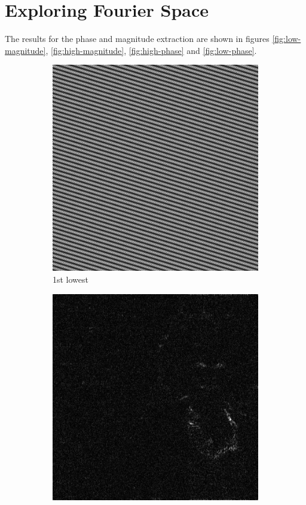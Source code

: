 \section{Exploring Fourier Space}

The results for the phase and magnitude extraction are shown in figures \ref{fig:low-magnitude}, \ref{fig:high-magnitude}, \ref{fig:high-phase} and \ref{fig:low-phase}.

\begin{figure}[h!]
\centering
\begin{subfigure}{0.2\textwidth}
  \centering
  \includegraphics[width=0.95\linewidth]{output/magnitud_low_1.jpg}
  \caption{1st lowest}
\end{subfigure}%
\begin{subfigure}{0.2\textwidth}
  \centering
  \includegraphics[width=0.95\linewidth]{output/magnitud_low_25.jpg}

\end{subfigure}
\end{figure}
